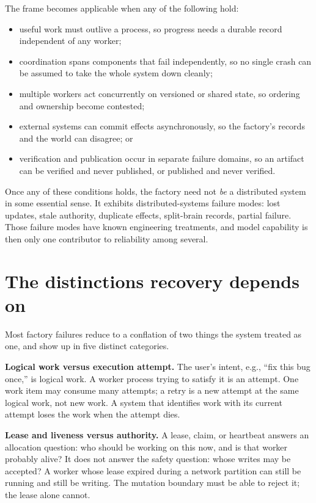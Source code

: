 The frame becomes applicable when any of the following hold:

\begin{itemize}
\tightlist
\item
  useful work must outlive a process, so progress needs a durable record independent of any worker;
\item
  coordination spans components that fail independently, so no single crash can be assumed to take the whole system down cleanly;
\item
  multiple workers act concurrently on versioned or shared state, so ordering and ownership become contested;
\item
  external systems can commit effects asynchronously, so the factory's records and the world can disagree; or
\item
  verification and publication occur in separate failure domains, so an artifact can be verified and never published, or published and never verified.
\end{itemize}

Once any of these conditions holds, the factory need not \emph{be} a distributed system in some essential sense. It exhibits distributed-systems failure modes: lost updates, stale authority, duplicate effects, split-brain records, partial failure. Those failure modes have known engineering treatments, and model capability is then only one contributor to reliability among several.

\hypertarget{the-distinctions-recovery-depends-on}{%
\section{The distinctions recovery depends on}\label{the-distinctions-recovery-depends-on}}

Most factory failures reduce to a conflation of two things the system treated as one, and show up in five distinct categories.

\textbf{Logical work versus execution attempt.} The user's intent, e.g., ``fix this bug once,'' is logical work. A worker process trying to satisfy it is an attempt. One work item may consume many attempts; a retry is a new attempt at the same logical work, not new work. A system that identifies work with its current attempt loses the work when the attempt dies.

\textbf{Lease and liveness versus authority.} A lease, claim, or heartbeat answers an allocation question: who should be working on this now, and is that worker probably alive? It does not answer the safety question: whose writes may be accepted? A worker whose lease expired during a network partition can still be running and still be writing. The mutation boundary must be able to reject it; the lease alone cannot.

